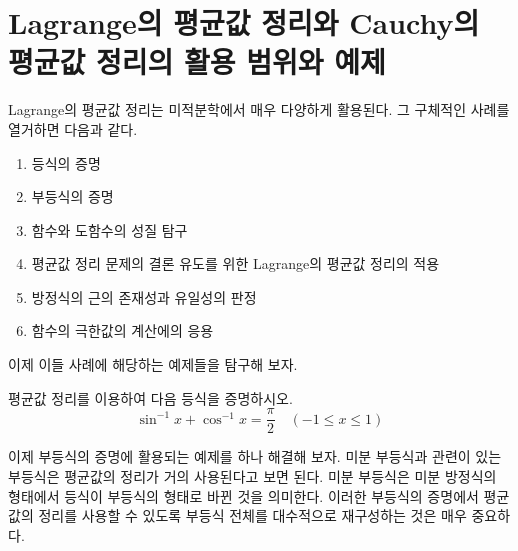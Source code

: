 \documentclass[a4paper]{article}
\begin{document}
\section{Lagrange의 평균값 정리와 Cauchy의 평균값 정리의 활용 범위와 예제}

Lagrange의 평균값 정리는 미적분학에서 매우 다양하게 활용된다. 그 구체적인 사례를 열거하면 다음과 같다.
\begin{enumerate}[label=\arabic*)]
	\item 등식의 증명
	\item 부등식의 증명
	\item 함수와 도함수의 성질 탐구
	\item 평균값 정리 문제의 결론 유도를 위한 Lagrange의 평균값 정리의 적용
	\item 방정식의 근의 존재성과 유일성의 판정
	\item 함수의 극한값의 계산에의 응용
\end{enumerate}
이제 이들 사례에 해당하는 예제들을 탐구해 보자.


\begin{problem}
	평균값 정리를 이용하여 다음 등식을 증명하시오.
	\[
	\sin^{-1} x + \cos^{-1} x = \frac{\pi}{2} \quad (-1 \le x \le 1)
	\]
\end{problem}
	\vspace{1em}
	
이제  부등식의 증명에 활용되는 예제를 하나 해결해 보자. 미분 부등식과 관련이 있는 부등식은 평균값의 정리가 거의 사용된다고 보면 된다. 미분 부등식은 미분 방정식의 형태에서 등식이 부등식의 형태로 바뀐 것을 의미한다. 이러한 부등식의 증명에서 평균값의 정리를 사용할 수 있도록 부등식 전체를 대수적으로 재구성하는 것은 매우 중요하다.
	
\end{document}
